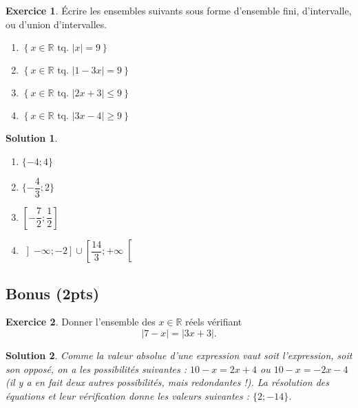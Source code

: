 \documentclass[a4paper, 14pt]{extarticle}
\theoremstyle{plain}
\newtheorem*{sol}{Solution}
\theoremstyle{definition}
\newtheorem{ex}{Exercice}
\newcommand{\R}{\mathbb{R}}
\newcommand{\xRtq}[1]{
	$\left\{ x \in \R \text{ tq. } #1 \right\}$
}
\newcommand{\vabs}[1]{
	\left| #1 \right|
}
\newcommand{\exe}[2]{
		\begin{ex} #1  \end{ex}
		\begin{sol} #2 \end{sol}
	}
\newcommand{\exe}[2]{
		\begin{ex} #1  \end{ex}
	}
\begin{document}
\exe{
	Écrire les ensembles suivants sous forme d'ensemble fini, d'intervalle, ou d'union d'intervalles.
	\begin{multicols}{2}
	\begin{enumerate}
		\item \xRtq{\vabs{x} = 9}
		\item \xRtq{\vabs{1-3x} = 9}
		\item \xRtq{\vabs{2x + 3} \leq 9}
		\item \xRtq{\vabs{3x-4} \geq 9}
	\end{enumerate}
	\end{multicols}
}
{

	\begin{multicols}{2}
	\begin{enumerate}
		\item $\{ -4 ; 4\}$
		\item $ \{ -\dfrac43 ; 2 \}$
		\item $\left[ -\dfrac72 ; \dfrac12\right]$
		\item $\left]-\infty ; -2\right] \cup \left[ \dfrac{14}3 ; +\infty \right[$
	\end{enumerate}
	\end{multicols}

}

\subsection*{Bonus (2pts)}

\exe{
	Donner l'ensemble des $x\in\R$ réels vérifiant
		\[ |7 - x| = |3x + 3|. \]
}
{
	Comme la valeur absolue d'une expression vaut soit l'expression, soit son opposé, on a les possibilités suivantes : $10-x = 2x+4$ ou $10-x = -2x-4$ (il y a en fait deux autres possibilités, mais redondantes !).
	La résolution des équations et leur vérification donne les valeurs suivantes :
	$\{ 2 ; -14 \}$.
}
\end{document}
